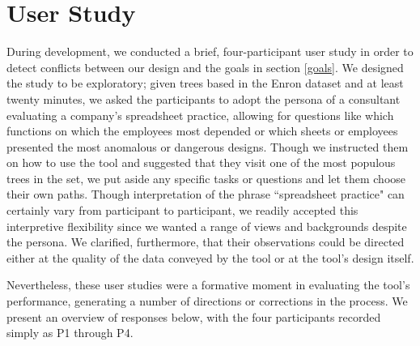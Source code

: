 \documentclass[conference]{IEEEtran}
\begin{document}
	\section{User Study} During development, we conducted a brief, four-participant
	user study in order to detect conflicts between our design and the goals in
	section \ref{goals}. We designed the study to be exploratory; given trees based
	in the Enron dataset and at least twenty minutes, we asked the participants to
	adopt the persona of a consultant evaluating a company's spreadsheet
	practice, allowing for questions like which functions on which the employees
	most depended or which sheets or employees presented the most anomalous or
	dangerous designs. Though we instructed them on how to use the tool and
	suggested that they visit one of the most populous trees in the set, we put
	aside any specific tasks or questions and let them choose their own paths.
	Though interpretation of the phrase ``spreadsheet practice" can certainly vary
	from participant to participant, we readily accepted this interpretive
	flexibility since we wanted a range of views and backgrounds despite the
	persona. We clarified, furthermore, that their observations could be directed either at the
	quality of the data conveyed by the tool or at the tool's design itself. \par
	
	Nevertheless, these user studies were a formative moment in evaluating the
	tool's performance, generating a number of directions or corrections in the
	process. We present an overview of responses below, with the four participants
	recorded simply as P1 through P4. \par
	
\end{document}
